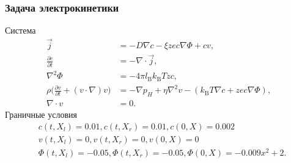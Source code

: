 \documentclass[t]{beamer}
\begin{document}
    \begin{frame}
        \frametitle{Задача электрокинетики}
        Система
        \begin{equation*}\label{eq:ek_eq}
            \begin{aligned}
                \vec{j}                                             & =
                -D \nabla c - \xi z e c \nabla \Phi + c v,                                    \\
                \frac{\partial c}{\partial t}                                      & =
                -\nabla \cdot\vec{j},                                                         \\
                \nabla^2 \Phi                                       & =
                -4 \pi l_\mathrm{B} k_\mathrm{B}T z c,                                        \\
                \rho \big( \frac{\partial v}{\partial t} + (v \cdot \nabla ) v \big) & =
                -\nabla p_H + \eta \nabla^{2} v - (k_\mathrm{B}T \nabla c + zec \nabla \Phi), \\
                \nabla \cdot v                                      & =
                0.
            \end{aligned}
        \end{equation*}
        Граничные условия
        \begin{equation*}\label{eq:ek_bnd}
            \begin{aligned}
                &c(t, X_l)    = 0.01, c(t, X_r)    = 0.01, c(0, X)      = 0.002        \\
                &v(t, X_l)    = 0, v(t, X_r)    = 0, v(0, X)      = 0            \\
                &\Phi(t, X_l) = -0.05, \Phi(t, X_r) = -0.05, \Phi(0, X)   = -0.009x^2+2.
            \end{aligned}
        \end{equation*}
    \end{frame}
\end{document}
